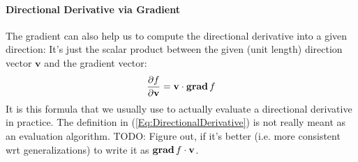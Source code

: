 \paragraph{Directional Derivative via Gradient}
The gradient can also help us to compute the directional derivative into a given direction: It's just the scalar product between the given (unit length) direction vector $\mathbf{v}$ and the gradient vector:
\begin{equation}
 \frac{\partial f}{\partial \mathbf{v}} = \mathbf{v} \cdot \operatorname{\mathbf{grad}} f
\end{equation}
It is this formula that we usually use to actually evaluate a directional derivative in practice. The definition in (\ref{Eq:DirectionalDerivative}) is not really meant as an evaluation algorithm. TODO: Figure out, if it's better (i.e. more consistent wrt generalizations) to write it as $\operatorname{\mathbf{grad}} f \cdot \mathbf{v}$.

